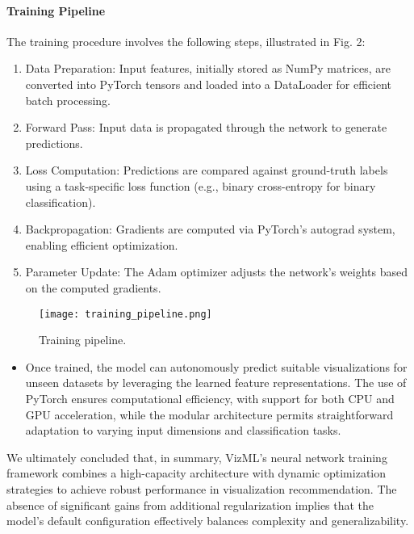 \paragraph{Training Pipeline}
The training procedure involves the following steps, illustrated in Fig. 2:

\begin{enumerate}
    \item Data Preparation: Input features, initially stored as NumPy matrices, are converted into PyTorch tensors and loaded into a DataLoader for efficient batch processing.
    \item Forward Pass: Input data is propagated through the network to generate predictions.
    \item Loss Computation: Predictions are compared against ground-truth labels using a task-specific loss function (e.g., binary cross-entropy for binary classification).
    \item Backpropagation: Gradients are computed via PyTorch's autograd system, enabling efficient optimization.
    \item Parameter Update: The Adam optimizer adjusts the network's weights based on the computed gradients.
\end{enumerate}


\begin{figure}[h]
    \centering
    \texttt{[image: training\_pipeline.png]}
    \caption{Training pipeline.}  
    \label{fig:training_pipeline}               
\end{figure}

\begin{itemize}
\item Once trained, the model can autonomously predict suitable visualizations for unseen datasets by leveraging the learned feature representations. The use of PyTorch ensures computational efficiency, with support for both CPU and GPU acceleration, while the modular architecture permits straightforward adaptation to varying input dimensions and classification tasks.
\end{itemize}


We ultimately concluded that, in summary, VizML's neural network training framework combines a high-capacity architecture with dynamic optimization strategies to achieve robust performance in visualization recommendation. The absence of significant gains from additional regularization implies that the model's default configuration effectively balances complexity and generalizability.
